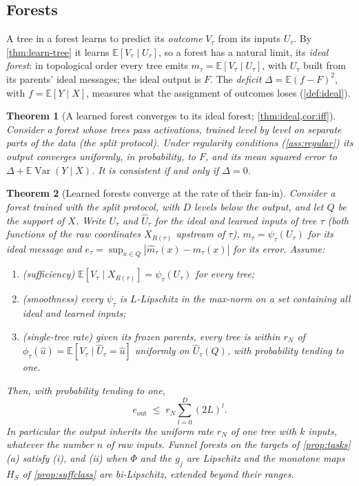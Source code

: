 \documentclass[11pt]{article}
\newtheorem{theorem}{Theorem}
\theoremstyle{definition}
\theoremstyle{remark}
\newcommand{\E}{\mathbb{E}}
\newcommand{\Var}{\operatorname{Var}}
\begin{document}
\subsection{Forests}

A tree in a forest learns to predict its \emph{outcome} $V_\tau$ from its inputs $U_\tau$.
By \cref{thm:learn-tree} it learns $\E[V_\tau\mid U_\tau]$, so a forest has a natural limit,
its \emph{ideal forest}: in topological order every tree emits $m_\tau=\E[V_\tau\mid U_\tau]$,
with $U_\tau$ built from its parents' ideal messages; the ideal output is $F$.  The
\emph{deficit} $\Delta=\E(f-F)^2$, with $f=\E[Y\mid X]$, measures what the assignment of
outcomes loses (\cref{def:ideal}).

\begin{theorem}[A learned forest converges to its ideal forest; \cref{thm:ideal,cor:iff}]\label{thm:learn-forest}
Consider a forest whose trees pass activations, trained level by level on separate parts
of the data (the split protocol).  Under regularity conditions (\cref{ass:regular}) its
output converges uniformly, in probability, to $F$, and its mean squared error to
$\Delta+\E\Var(Y\mid X)$.  It is consistent if and only if $\Delta=0$.
\end{theorem}

\begin{theorem}[Learned forests converge at the rate of their fan-in]\label{thm:learn-rate}
Consider a forest trained with the split protocol, with $D$ levels below the output, and
let $Q$ be the support of $X$.  Write $U_\tau$ and $\hat U_\tau$ for the ideal and learned
inputs of tree $\tau$ (both functions of the raw coordinates $X_{R(\tau)}$ upstream of
$\tau$), $m_\tau=\psi_\tau(U_\tau)$ for its ideal message and
$e_\tau=\sup_{x\in Q}|\hat m_\tau(x)-m_\tau(x)|$ for its error.  Assume:
\begin{enumerate}[label=(\roman*),leftmargin=*,noitemsep]
\item (sufficiency) $\E[V_\tau\mid X_{R(\tau)}]=\psi_\tau(U_\tau)$ for every tree;
\item (smoothness) every $\psi_\tau$ is $L$-Lipschitz in the max-norm on a set containing
  all ideal and learned inputs;
\item (single-tree rate) given its frozen parents, every tree is within $r_N$ of
  $\phi_\tau(\hat u)=\E[V_\tau\mid\hat U_\tau=\hat u]$ uniformly on $\hat U_\tau(Q)$, with
  probability tending to one.
\end{enumerate}
Then, with probability tending to one,
\[
  e_{\text{out}}\;\le\;r_N\sum_{l=0}^{D}(2L)^l .
\]
In particular the output inherits the uniform rate $r_N$ of one tree with $k$ inputs, whatever
the number $n$ of raw inputs.
Funnel forests on the targets of \cref{prop:tasks}(a) satisfy (i), and (ii) when $\Phi$ and
the $g_j$ are Lipschitz and the monotone maps $H_S$ of \cref{prop:suffclass} are bi-Lipschitz,
extended beyond their ranges.
\end{theorem}
\end{document}
